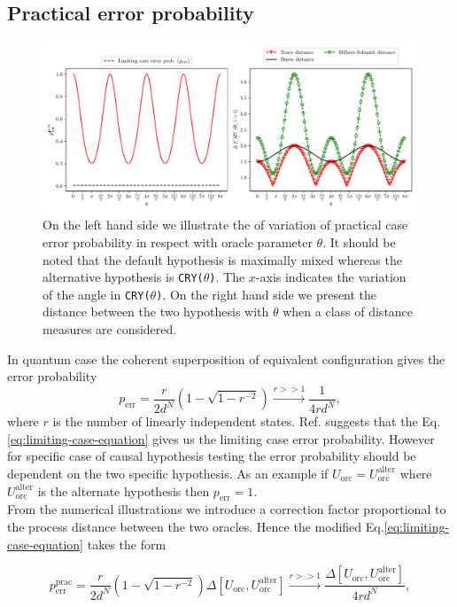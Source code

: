 \documentclass[
 aps,
 jmp,
 amsmath,amssymb,
 reprint,
]{revtex4-2}
\begin{document}
\subsection{ Practical error probability}
\begin{figure}
	\centering
	\includegraphics[width = \linewidth]{plot/limiting_error_prob.pdf}
	\caption{On the left hand side we illustrate the of variation of practical case error probability in respect with oracle parameter $\theta$. It should be noted that the default hypothesis is maximally mixed whereas the alternative hypothesis is \texttt{CRY($\theta$)}. The $x$-axis indicates the variation of the angle in \texttt{CRY($\theta$)}. On the right hand side we present the distance between the two hypothesis with $\theta$ when a class of distance measures are considered.}
	\label{fig:practical-case-error-plot}
\end{figure}
In quantum case the coherent superposition of equivalent configuration gives the error probability \cite{chiribella2019quantum}
\begin{equation}
p_\textrm{err} = \frac{r}{2d^N}\left( 1-\sqrt{1-r^{-2}} \right) \xrightarrow[]{r>>1}\frac{1}{4rd^N},\label{eq:limiting-case-equation}
\end{equation}
where $r$ is the number of linearly independent states. Ref.\cite{chiribella2019quantum} suggests that the Eq.\eqref{eq:limiting-case-equation} gives us the limiting case error probability. However for specific case of causal hypothesis testing the error probability should be dependent on the two specific hypothesis. As an example if $U_\textrm{orc} = U_\textrm{orc}^\textrm{alter}$ where $U_\textrm{orc}^\textrm{alter}$ is the alternate hypothesis then $p_\textrm{err} =1$.\\
From the numerical illustrations we introduce a correction factor proportional to the process distance between the two oracles. Hence the modified Eq.\eqref{eq:limiting-case-equation} takes the form
\begin{widetext}
\begin{equation}
p_\textrm{err}^\textrm{prac} = \frac{r}{2d^N}\left( 1-\sqrt{1-r^{-2}} \right)\Delta\left[U_\textrm{orc}, U_\textrm{orc}^\textrm{alter}\right] \xrightarrow[]{r>>1}\frac{\Delta\left[U_\textrm{orc}, U_\textrm{orc}^\textrm{alter}\right]}{4rd^N},\label{eq:practical-case-equation}
\end{equation}
\end{widetext}
\end{document}
